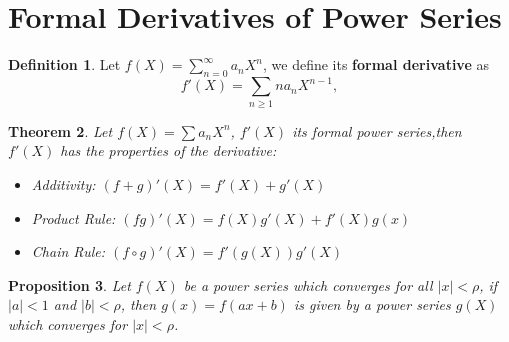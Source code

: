 \documentclass{article}
\theoremstyle{plain}
\newtheorem{thm}{Theorem}[section]
\newtheorem{prop}[thm]{Proposition}
\theoremstyle{definition}
\newtheorem{defi}[thm]{Definition}
\begin{document}
\begin{minipage}[t]{0.49\textwidth}
		\section{Formal Derivatives of Power Series}
		\begin{defi}
		Let $f(X) = \sum_{n=0}^{\infty} a_{n}X^{n} $, we define its \textbf{formal derivative} as
		$$f'(X) = \sum_{n\geq 1} na_{n}X^{n-1}, $$
		\end{defi}
		\begin{thm} Let $f(X) = \sum a_{n}X^{n}$, $f'(X)$ its formal power series,then $f'(X)$ has the properties of the derivative:
		\begin{itemize}
		\item Additivity: $(f+g)'(X) = f'(X) + g'(X)$
		\item Product Rule: $(fg)'(X) = f(X)g'(X) + f'(X)g(x)$
		\item Chain Rule: $(f \circ g)'(X) = f'(g(X))g'(X)$
		\end{itemize}
		\end{thm}
		\begin{prop} %
		Let $f(X)$ be a power series which converges for all $|x| < \rho$, if $|a| < 1$ and $|b| < \rho$, then $g(x) = f(ax+b)$ is given by a power series $g(X)$ which converges for $|x| < \rho$.
		\end{prop}
	\end{minipage}%
	\hfill
\end{document}
